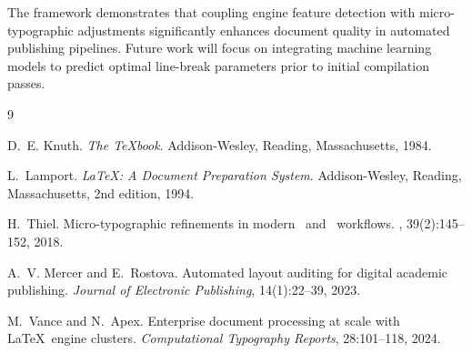 \documentclass{ltugboat}
\begin{document}
The  framework demonstrates that coupling engine feature detection with micro-typographic adjustments significantly enhances document quality in automated publishing pipelines. Future work will focus on integrating machine learning models to predict optimal line-break parameters prior to initial compilation passes.

\begin{thebibliography}{9}

D.~E. Knuth.
\newblock \textit{The \TeX book}.
\newblock Addison-Wesley, Reading, Massachusetts, 1984.

L.~Lamport.
\newblock \textit{\LaTeX: A Document Preparation System}.
\newblock Addison-Wesley, Reading, Massachusetts, 2nd edition, 1994.

H.~Thiel.
\newblock Micro-typographic refinements in modern \pdfTeX\ and \LuaTeX\ workflows.
\newblock \textit{\TUB}, 39(2):145--152, 2018.

A.~V. Mercer and E.~Rostova.
\newblock Automated layout auditing for digital academic publishing.
\newblock \textit{Journal of Electronic Publishing}, 14(1):22--39, 2023.

M.~Vance and N.~Apex.
\newblock Enterprise document processing at scale with \LaTeX\ engine clusters.
\newblock \textit{Computational Typography Reports}, 28:101--118, 2024.

\end{thebibliography}

\makesignature
\end{document}
